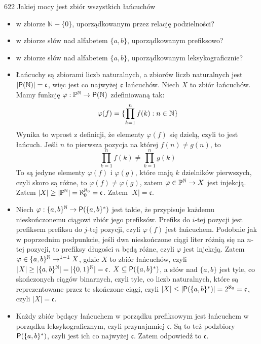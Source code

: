 \documentclass{../note}
\begin{document}
\begin{zadanie}{622}
Jakiej mocy jest zbiór wszystkich łańcuchów
\begin{itemize}[label=--]
    \item w zbiorze $\mathbb{N} - \{0\}$, uporządkowanym przez relację podzielności?
    \item w zbiorze słów nad alfabetem $\{a, b\}$, uporządkowanym prefiksowo?
    \item w zbiorze słów nad alfabetem $\{a, b\}$, uporządkowanym leksykograficznie?
\end{itemize}
\end{zadanie}
\begin{rozwiazanie}
\begin{itemize}[label=--]
    \item Łańcuchy są zbiorami liczb naturalnych, a zbiorów liczb naturalnych jest $|\mathsf{P}(\mathbb{N})| = \mathfrak{c}$, więc jest co najwyżej $\mathfrak{c}$ łańcuchów. Niech $X$ to zbiór łańcuchów. Mamy funkcję $\varphi : \mathbb{P}^{\mathbb{N}} \to \mathsf{P}(\mathbb{N})$ zdefiniowaną tak:
    \[\varphi(f) = \{\prod_{k=1}^{n} f(k): n \in \mathbb{N}\}\]
    Wynika to wprost z definicji, że elementy $\varphi(f)$ się dzielą, czyli to jest łańcuch. Jeśli $n$ to pierwsza pozycja na której $f(n) \neq g(n)$, to
    \[\prod_{k=1}^{n} f(k) \neq \prod_{k=1}^{n} g(k)\]
    To są jedyne elementy $\varphi(f)$ i $\varphi(g)$, które mają $k$ dzielników pierwszych, czyli skoro są różne, to $\varphi(f) \neq \varphi(g)$, zatem $\varphi \in \mathbb{P}^{\mathbb{N}} \to X$ jest injekcją. Zatem $|X| \geq |\mathbb{P}^{\mathbb{N}}| = \aleph_0^{\aleph_0} = \mathfrak{c}$. Zatem $|X| = \mathfrak{c}$.
    \item Niech $\varphi : \{a,b\}^{\mathbb{N}} \to \mathsf{P}(\{a, b\}^*)$ jest takie, że przypisuje każdemu nieskończonemu ciągowi zbiór jego prefiksów. Prefiks do $i$-tej pozycji jest prefiksem prefiksu do $j$-tej pozycji, czyli $\varphi(f)$ jest łańcuchem. Podobnie jak w poprzednim podpunkcie, jeśli dwa nieskończone ciągi liter różnią się na $n$-tej pozycji, to prefiksy długości $n$ będą różne, czyli $\varphi$ jest injekcją. Zatem $\varphi \in \{a,b\}^{\mathbb{N}} \to^{1-1} X$, gdzie $X$ to zbiór łańcuchów, czyli $|X| \geq |\{a,b\}^{\mathbb{N}}| = |\{0,1\}^{\mathbb{N}}| = \mathfrak{c}$. $X \subseteq \mathsf{P}(\{a, b\}^*)$, a słów nad $\{a, b\}$ jest tyle, co skończonych ciągów binarnych, czyli tyle, co liczb naturalnych, które są reprezentowane przez te skończone ciągi, czyli $|X| \leq |\mathsf{P}(\{a, b\}^*)| = 2^{\aleph_0} = \mathfrak{c}$, czyli $|X| = \mathfrak{c}$.
    \item Każdy zbiór będący łańcuchem w porządku prefiksowym jest łańcuchem w porządku leksykograficznym, czyli przynajmniej $\mathfrak{c}$. Są to też podzbiory $\mathsf{P}(\{a, b\}^*)$, czyli jest ich co najwyżej $\mathfrak{c}$. Zatem odpowiedź to $\mathfrak{c}$.
\end{itemize}
\end{rozwiazanie}
\end{document}
